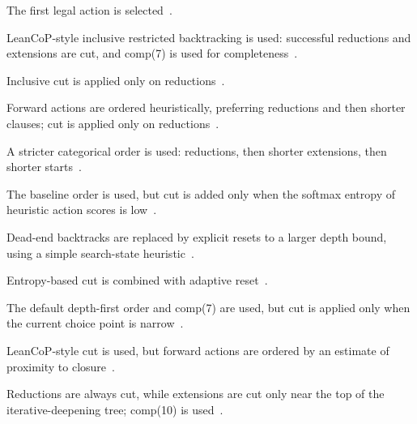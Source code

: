 \documentclass[11pt,twocolumn]{article}
\newcommand{\atom}[1]{\colorbox{Gray!30}{\ttfamily #1}}
\newcommand{\citen}[1]{~\parencite{#1}}
\begin{document}
\begin{description}[style=nextline, itemsep=-3pt, leftmargin=18pt]
	\item[FirstAction] The first legal action is selected\citen{letzModelEliminationConnection2001,ottenLeanCoP20}.
	\item[LeanCopCut] LeanCoP-style inclusive restricted backtracking is used: successful reductions and extensions are cut, and \atom{comp(7)} is used for completeness\citen{ottenLeanCoP20}.
	\item[ReductionCut] Inclusive cut is applied only on reductions\citen{farberCuriouslyEffectiveBacktracking2024}.
	\item[HeuristicReductionCut] Forward actions are ordered heuristically, preferring reductions and then shorter clauses; cut is applied only on reductions\citen{letzModelEliminationConnection2001,farberCuriouslyEffectiveBacktracking2024}.
	\item[SubgoalReordering] A stricter categorical order is used: reductions, then shorter extensions, then shorter starts\citen{letzModelEliminationConnection2001}.
	\item[EntropyCut] The baseline order is used, but \atom{cut} is added only when the softmax entropy of heuristic action scores is low\citen{zomboriRoleEntropyGuiding2021}.
	\item[AdaptiveReset] Dead-end backtracks are replaced by explicit resets to a larger depth bound, using a simple search-state heuristic\citen{HoldenSATQSAT,liReinforcementLearningBased2024}.
	\item[SmartCut] Entropy-based cut is combined with adaptive reset\citen{zomboriRoleEntropyGuiding2021,HoldenSATQSAT,liReinforcementLearningBased2024}.
\item[FewAlternativesCut] The default depth-first order and \atom{comp(7)} are used, but \atom{cut} is applied only when the current choice point is narrow\citen{ottenLeanCoP20,farberCuriouslyEffectiveBacktracking2024}.
\item[GoalDistanceCut] LeanCoP-style cut is used, but forward actions are ordered by an estimate of proximity to closure\citen{letzModelEliminationConnection2001}.
\item[DepthPhasedCut] Reductions are always cut, while extensions are cut only near the top of the iterative-deepening tree; \atom{comp(10)} is used\citen{ottenLeanCoP20}.
\end{description}

\newcommand{\NA}{{---}}
\end{document}
